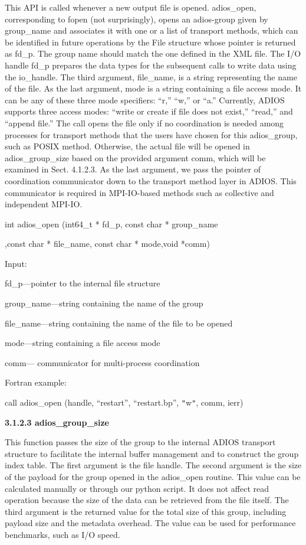 This API is called whenever a new output file is opened. adios\_open, corresponding 
to fopen (not surprisingly), opens an adios-group given by group\_name\textit{ 
}and associates it with one or a list of transport methods, which can be identified 
in future operations by the File structure whose pointer is returned as\textit{ 
}fd\_p. The group name should match the one defined in the XML file. The I/O handle 
fd\_p prepares the data types for the subsequent calls to write data using the 
io\_handle. The third argument, file\_name, is a string representing the name of 
the file. As the last argument, mode is a string containing a file access mode. 
It can be any of these three mode specifiers: ``r,'' ``w,'' or ``a.'' Currently, 
ADIOS supports three access modes: ``write or create if file does not exist,'' 
``read,'' and ``append file.'' The call opens the file only if no coordination 
is needed among processes for transport methods that the users have chosen for 
this adios\_group, such as POSIX method. Otherwise, the actual file will be opened 
in adios\_group\_size based on the provided argument comm, which will be examined 
in Sect. 4.1.2.3. As the last argument, we pass the pointer of coordination communicator 
down to the transport method layer in ADIOS. This communicator is required in MPI-IO-based 
methods such as collective and independent MPI-IO.

\leftskip=103pt
\parindent=-81pt
int adios\_open (int64\_t * fd\_p, const char * group\_name

,const char * file\_name, const char * mode,void *comm)

\leftskip=22pt
\parindent=0pt
Input: 

\leftskip=36pt
fd\_p---pointer to the internal file structure

group\_name---string containing the name of the group 

file\_name---string containing the name of the file to be opened 

mode---string containing  a file access mode

comm--- communicator for multi-process coordination

\leftskip=22pt
Fortran example: 

\parindent=13pt
call adios\_open (handle, ``restart'', ``restart.bp'', \texttt{"}w\texttt{"}, comm, 
ierr)

\leftskip=0pt
\parindent=0pt
\textbf{3.1.2.3 adios\_group\_size}

This function passes the size of the group to the internal ADIOS transport structure 
to facilitate the internal buffer management and to construct the group index table. 
The first argument is the file handle. The second argument is the size of the payload 
for the group opened in the adios\_open routine. This value can be calculated manually 
or through our python script. It does not affect read operation because the size 
of the data can be retrieved from the file itself. The third argument is the returned 
value for the total size of this group, including payload size and the metadata 
overhead. The value can be used for performance benchmarks, such as I/O speed. 

